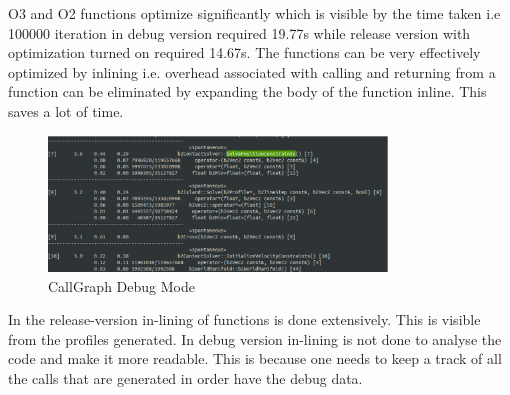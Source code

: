 \documentclass[a4paper,11pt]{article}
\begin{document}
O3 and O2 functions optimize significantly which is visible by the time taken i.e 100000 iteration in debug version required 19.77s while release version with optimization turned on required 14.67s.
The functions can be very effectively optimized by inlining i.e. overhead associated with calling and returning from a function can be eliminated by expanding the body of the function inline. This saves a lot of time.\\
\begin{figure}[ht]
	\begin{minipage}[ht]{0.5\linewidth}
	\includegraphics[width=90mm]{images/1.eps}
	\caption{CallGraph Debug Mode }	
	\end{minipage}	
	\end{figure}

In the release-version in-lining of functions is done extensively. This is visible from the profiles generated. In debug version in-lining is not done to analyse the code and make it more readable. This is because one needs to keep a track of all the calls that are generated in order have the debug data.\\
\end{document}
